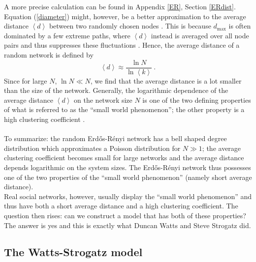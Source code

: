 \documentclass[11 pt , letterpaper , twoside , openright]{book}
\begin{document}
A more precise calculation can be found in Appendix \ref{ER}, Section \ref{ERdist}. Equation (\ref{diameter}) might, however, be a better approximation to the average distance $\left<d\right>$ between two randomly chosen nodes \cite{Albert2014}. This is because $d_{\textrm{max}}$ is often dominated by a few extreme paths, where $\left<d\right>$ instead is averaged over all node pairs and thus suppresses these fluctuations \cite{Albert2014}. Hence, the average distance of a random network is defined by \cite{Albert2014}
\begin{equation}\label{d}
	\left<d\right> \approx \frac{\ln{N}}{\ln{\left<k\right>}} \ .
\end{equation}
Since for large $N$, $\ln{N} \ll N$, we find that the average distance is a lot smaller than the size of the network. Generally, the logarithmic dependence of the average distance $\left<d\right>$ on the network size $N$ is one of the two defining properties of what is referred to as the ``small world phenomenon''; the other property is a high clustering coefficient \cite{Easley2010}.  \\
\\
To summarize: the random Erd\H{o}s-R\'{e}nyi network has a bell shaped degree distribution which approximates a Poisson distribution for $N \gg 1$; the average clustering coefficient becomes small for large networks and the average distance depends logarithmic on the system sizes. The Erd\H{o}s-R\'{e}nyi network thus possesses one of the two properties of the ``small world phenomenon'' (namely short average distance).\\
Real social networks, however, usually display the ``small world phenomenon'' and thus have both a short average distance and a high clustering coefficient. The question then rises: can we construct a model that has both of these properties? The answer is yes and this is exactly what Duncan Watts and Steve Strogatz did.

\subsection{The Watts-Strogatz model}
\end{document}
